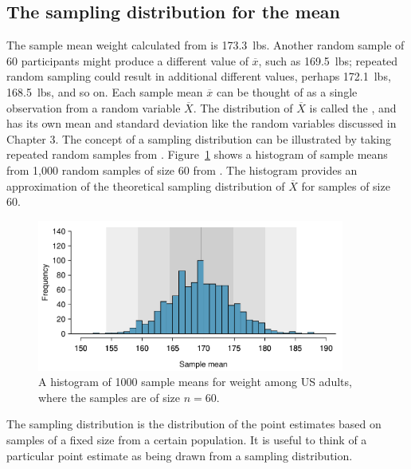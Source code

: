 

\subsection{The sampling distribution for the mean}

The sample mean weight calculated from  is 173.3~lbs. Another random sample of 60 participants might produce a different value of $\overline{x}$, such as 169.5~lbs; repeated random sampling could result in additional different values, perhaps 172.1~lbs, 168.5~lbs, and so on. Each sample mean $\overline{x}$ can be thought of as a single observation from a random variable $\overline{X}$. The distribution of $\overline{X}$ is called the , and has its own mean and standard deviation like the random variables discussed in Chapter 3. The concept of a sampling distribution can be illustrated by taking repeated random samples from . Figure~\ref{cdcWeight1000SampDist} shows a histogram of sample means from 1,000 random samples of size 60 from . The histogram provides an approximation of the theoretical sampling distribution of $\overline{X}$ for samples of size 60. 

\begin{figure}[h]
	\centering
	\includegraphics[width=0.9\textwidth]
	{ch_inference_foundations_oi_biostat/figures/cdcWeight1000SampDist/cdcWeight1000SampDist}
	\caption{A histogram of 1000 sample means for weight among US adults, where the samples are of size $n=60$.}
	\label{cdcWeight1000SampDist}
\end{figure}

\begin{termBox}{
The sampling distribution is the distribution of the point estimates based on samples of a fixed size from a certain population. It is useful to think of a particular point estimate as being drawn from a sampling distribution.}
\end{termBox}

